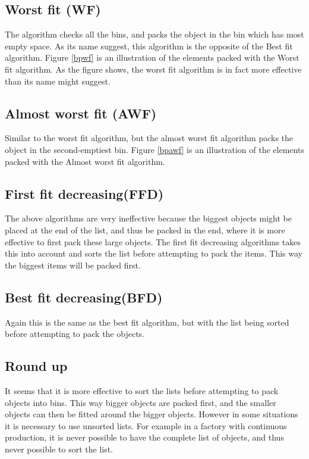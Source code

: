\subsection{Worst fit (WF)}
The algorithm checks all the bins, and packs the object in the bin which has most empty space. As its name suggest, this algorithm is the opposite of the Best fit algorithm. Figure \ref{bpwf} is an illustration of the elements packed with the Worst fit algorithm. As the figure shows, the worst fit algorithm is in fact more effective than its name might suggest. 

\subsection{Almost worst fit (AWF)}
Similar to the worst fit algorithm, but the almost worst fit algorithm packs the object in the second-emptiest bin.  Figure \ref{bpawf} is an illustration of the elements packed with the Almost worst fit algorithm.

\subsection{First fit decreasing(FFD)}
The above algorithms are very ineffective because the biggest objects might be placed at the end of the list, and thus be packed in the end, where it is more effective to first pack these large objects.
The first fit decreasing algorithms takes this into account and sorts the list before attempting to pack the items. This way the biggest items will be packed first.

\subsection{Best fit decreasing(BFD)}
Again this is the same as the best fit algorithm, but with the list being sorted before attempting to pack the objects.

\subsection{Round up}
It seems that it is more effective to sort the lists before attempting to pack objects into bins. This way bigger objects are packed first, and the smaller objects can then be fitted around the bigger objects. However in some situations it is necessary to use unsorted lists. For example in a factory with continuous production, it is never possible to have the complete list of objects, and thus never possible to sort the list.

